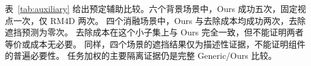 表~\ref{tab:auxiliary} 给出预定辅助比较。六个背景场景中，Ours 成功五次，固定视点一次，仅 RM4D 两次。
四个消融场景中，Ours 与去除成本均成功两次，去除遮挡预测为零次。
去除成本在这个小子集上与 Ours 完全一致，但不能证明两者等价或成本无必要。
同样，四个场景的遮挡结果仅为描述性证据，不能证明组件的普遍必要性。
任务加权的主要隔离证据仍是完整 Generic/Ours 比较。

\begin{table}[tb]\centering
\caption{使用预定 Ours 对应任务的描述性辅助比较。
$a,b,c,d$ 含义同表~\ref{tab:paired}，其中 Generic 替换为所列对照。
这些子集不是具有预定统计功效的次要实验。}
\label{tab:auxiliary}\resizebox{\linewidth}{!}{}
\end{table}
